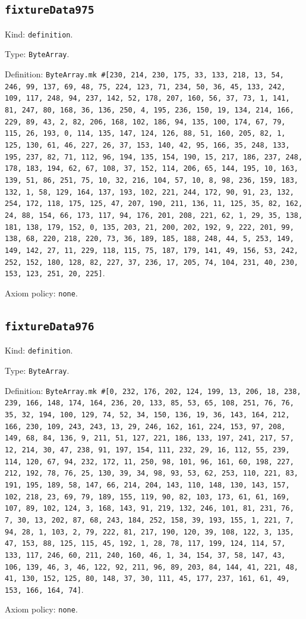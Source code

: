 \documentclass[11pt]{article}
\begin{document}
\subsection*{\texttt{fixtureData975}}
\noindent Kind: \texttt{definition}.\par
\noindent Type: \texttt{ByteArray}.\par
\noindent Definition: \texttt{ByteArray.mk \#[230, 214, 230, 175, 33, 133, 218, 13, 54, 246, 99, 137, 69, 48, 75, 224, 123, 71, 234, 50, 36, 45, 133, 242, 109, 117, 248, 94, 237, 142, 52, 178, 207, 160, 56, 37, 73, 1, 141, 81, 247, 80, 168, 36, 136, 250, 4, 195, 236, 150, 19, 134, 214, 166, 229, 89, 43, 2, 82, 206, 168, 102, 186, 94, 135, 100, 174, 67, 79, 115, 26, 193, 0, 114, 135, 147, 124, 126, 88, 51, 160, 205, 82, 1, 125, 130, 61, 46, 227, 26, 37, 153, 140, 42, 95, 166, 35, 248, 133, 195, 237, 82, 71, 112, 96, 194, 135, 154, 190, 15, 217, 186, 237, 248, 178, 183, 194, 62, 67, 108, 37, 152, 114, 206, 65, 144, 195, 10, 163, 139, 51, 86, 251, 75, 10, 32, 216, 104, 57, 10, 8, 98, 236, 159, 183, 132, 1, 58, 129, 164, 137, 193, 102, 221, 244, 172, 90, 91, 23, 132, 254, 172, 118, 175, 125, 47, 207, 190, 211, 136, 11, 125, 35, 82, 162, 24, 88, 154, 66, 173, 117, 94, 176, 201, 208, 221, 62, 1, 29, 35, 138, 181, 138, 179, 152, 0, 135, 203, 21, 200, 202, 192, 9, 222, 201, 99, 138, 68, 220, 218, 220, 73, 36, 189, 185, 188, 248, 44, 5, 253, 149, 149, 142, 27, 11, 229, 118, 115, 75, 187, 179, 141, 49, 156, 53, 242, 252, 152, 180, 128, 82, 227, 37, 236, 17, 205, 74, 104, 231, 40, 230, 153, 123, 251, 20, 225]}.\par
\noindent Axiom policy: \texttt{none}.\par
\subsection*{\texttt{fixtureData976}}
\noindent Kind: \texttt{definition}.\par
\noindent Type: \texttt{ByteArray}.\par
\noindent Definition: \texttt{ByteArray.mk \#[0, 232, 176, 202, 124, 199, 13, 206, 18, 238, 239, 166, 148, 174, 164, 236, 20, 133, 85, 53, 65, 108, 251, 76, 76, 35, 32, 194, 100, 129, 74, 52, 34, 150, 136, 19, 36, 143, 164, 212, 166, 230, 109, 243, 243, 13, 29, 246, 162, 161, 224, 153, 97, 208, 149, 68, 84, 136, 9, 211, 51, 127, 221, 186, 133, 197, 241, 217, 57, 12, 214, 30, 47, 238, 91, 197, 154, 111, 232, 29, 16, 112, 55, 239, 114, 120, 67, 94, 232, 172, 11, 250, 98, 101, 96, 161, 60, 198, 227, 212, 192, 78, 76, 25, 130, 39, 34, 98, 93, 53, 62, 253, 110, 221, 83, 191, 195, 189, 58, 147, 66, 214, 204, 143, 110, 148, 130, 143, 157, 102, 218, 23, 69, 79, 189, 155, 119, 90, 82, 103, 173, 61, 61, 169, 107, 89, 102, 124, 3, 168, 143, 91, 219, 132, 246, 101, 81, 231, 76, 7, 30, 13, 202, 87, 68, 243, 184, 252, 158, 39, 193, 155, 1, 221, 7, 94, 28, 1, 103, 2, 79, 222, 81, 217, 190, 120, 39, 108, 122, 3, 135, 47, 153, 88, 125, 115, 45, 192, 1, 28, 78, 117, 199, 124, 114, 57, 133, 117, 246, 60, 211, 240, 160, 46, 1, 34, 154, 37, 58, 147, 43, 106, 139, 46, 3, 46, 122, 92, 211, 96, 89, 203, 84, 144, 41, 221, 48, 41, 130, 152, 125, 80, 148, 37, 30, 111, 45, 177, 237, 161, 61, 49, 153, 166, 164, 74]}.\par
\noindent Axiom policy: \texttt{none}.\par
\end{document}
